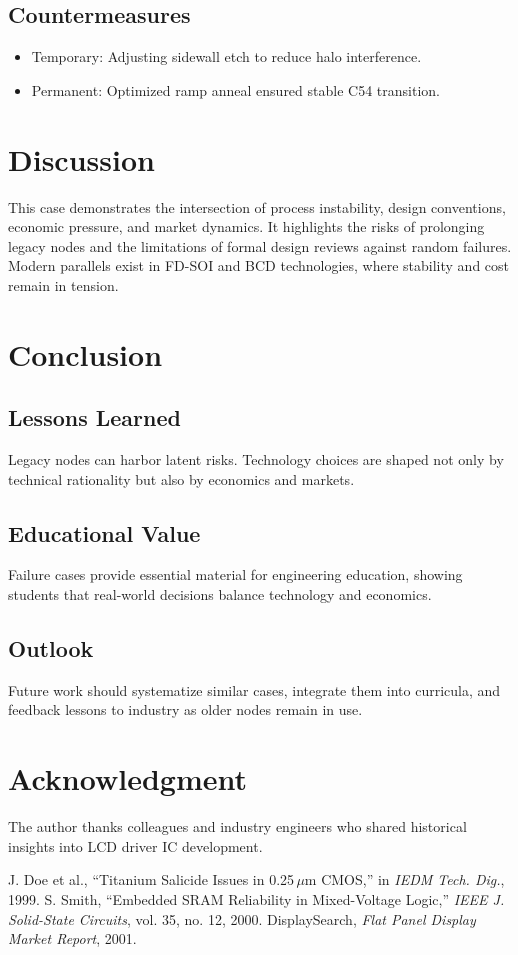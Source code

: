 \documentclass[conference]{IEEEtran}
\begin{document}
\subsection{Countermeasures}
\begin{itemize}
  \item Temporary: Adjusting sidewall etch to reduce halo interference.  
  \item Permanent: Optimized ramp anneal ensured stable C54 transition.  
\end{itemize}

\section{Discussion}
This case demonstrates the intersection of process instability, design conventions, economic pressure, and market dynamics.  
It highlights the risks of prolonging legacy nodes and the limitations of formal design reviews against random failures.  
Modern parallels exist in FD-SOI and BCD technologies, where stability and cost remain in tension.

\section{Conclusion}
\subsection{Lessons Learned}
Legacy nodes can harbor latent risks. Technology choices are shaped not only by technical rationality but also by economics and markets.  

\subsection{Educational Value}
Failure cases provide essential material for engineering education, showing students that real-world decisions balance technology and economics.  

\subsection{Outlook}
Future work should systematize similar cases, integrate them into curricula, and feedback lessons to industry as older nodes remain in use.  

\section*{Acknowledgment}
The author thanks colleagues and industry engineers who shared historical insights into LCD driver IC development.

\begin{thebibliography}{1}
 J. Doe et al., ``Titanium Salicide Issues in 0.25\,$\mu$m CMOS,'' in \textit{IEDM Tech. Dig.}, 1999.
 S. Smith, ``Embedded SRAM Reliability in Mixed-Voltage Logic,'' \textit{IEEE J. Solid-State Circuits}, vol. 35, no. 12, 2000.
 DisplaySearch, \textit{Flat Panel Display Market Report}, 2001.
\end{thebibliography}
\end{document}
